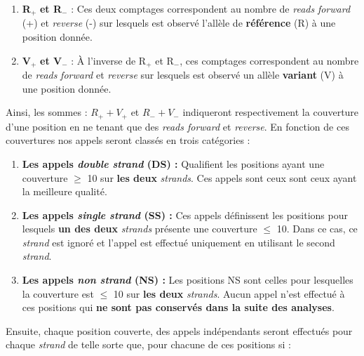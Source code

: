 \documentclass[12pt,twoside]{reedthesis}
\providecommand{\tightlist}{%
  \setlength{\itemsep}{0pt}\setlength{\parskip}{0pt}}
\theoremstyle{definition}
\theoremstyle{definition}
\theoremstyle{remark}
\begin{document}
  \begin{enumerate}
  \def\labelenumi{\arabic{enumi}.}
  \tightlist
  \item
    \textbf{R}\(_+\) \textbf{et R}\(_-\) : Ces deux comptages
    correspondent au nombre de \emph{reads} \emph{forward} (+) et
    \emph{reverse} (-) sur lesquels est observé l'allèle de
    \textbf{référence} (R) à une position donnée.\\
  \item
    \textbf{V}\(_+\) \textbf{et V}\(_-\) : À l'inverse de R\(_+\) et
    R\(_-\), ces comptages correspondent au nombre de \emph{reads}
    \emph{forward} et \emph{reverse} sur lesquels est observé un allèle
    \textbf{variant} (V) à une position donnée.
  \end{enumerate}
  
  Ainsi, les sommes : \(R_+ + V_+\) et \(R_- + V_-\) indiqueront
  respectivement la couverture d'une position en ne tenant que des
  \emph{reads forward} et \emph{reverse}. En fonction de ces couvertures
  nos appels seront classés en trois catégories :
  
  \begin{enumerate}
  \def\labelenumi{\arabic{enumi}.}
  \tightlist
  \item
    \textbf{Les appels \emph{double strand} (DS) :} Qualifient les
    positions ayant une couverture \(\ge\) 10 sur \textbf{les deux}
    \emph{strands}. Ces appels sont ceux sont ceux ayant la meilleure
    qualité.\\
  \item
    \textbf{Les appels \emph{single strand} (SS) :} Ces appels définissent
    les positions pour lesquels \textbf{un des deux} \emph{strands}
    présente une couverture \(\le\) 10. Dans ce cas, ce \emph{strand} est
    ignoré et l'appel est effectué uniquement en utilisant le second
    \emph{strand}.\\
  \item
    \textbf{Les appels \emph{non strand} (NS) :} Les positions NS sont
    celles pour lesquelles la couverture est \(\le\) 10 sur \textbf{les
    deux} \emph{strands}. Aucun appel n'est effectué à ces positions qui
    \textbf{ne sont pas conservés dans la suite des analyses}.
  \end{enumerate}
  
  Ensuite, chaque position couverte, des appels indépendants seront
  effectués pour chaque \emph{strand} de telle sorte que, pour chacune de
  ces positions si :
  
\end{document}
